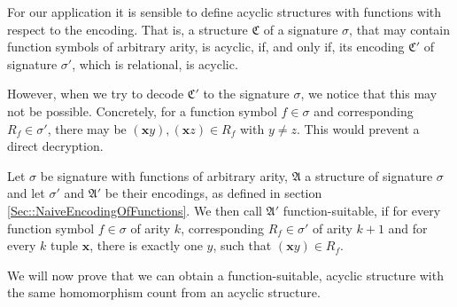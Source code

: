 For our application it is sensible to define acyclic structures with functions with respect to the encoding.
That is, a structure $\mathfrak C$ of a signature $\sigma$, that may contain function symbols of arbitrary arity, is acyclic, if, and only if, its encoding $\mathfrak C'$ of signature $\sigma'$, which is relational, is acyclic.

However, when we try to decode $\mathfrak C'$ to the signature $\sigma$, we notice that this may not be possible.
Concretely, for a function symbol $f\in\sigma$ and corresponding $R_f\in\sigma'$, there may be $(\mathbf x y),(\mathbf x z)\in R_f$ with $y\neq z$.
This would prevent a direct decryption.

\begin{definition}
	Let $\sigma$ be signature with functions of arbitrary arity, $\mathfrak A$ a structure of signature $\sigma$ and let $\sigma'$ and $\mathfrak A'$ be their encodings, as defined in section \ref{Sec::NaiveEncodingOfFunctions}.
	We then call $\mathfrak A'$ function-suitable, if for every function symbol $f\in\sigma$ of arity $k$, corresponding $R_f\in\sigma'$ of arity $k+1$ and for every $k$ tuple $\mathbf x$, there is exactly one $y$, such that $(\mathbf x y)\in R_f$.
\end{definition}

We will now prove that we can obtain a function-suitable, acyclic structure with the same homomorphism count from an acyclic structure.

